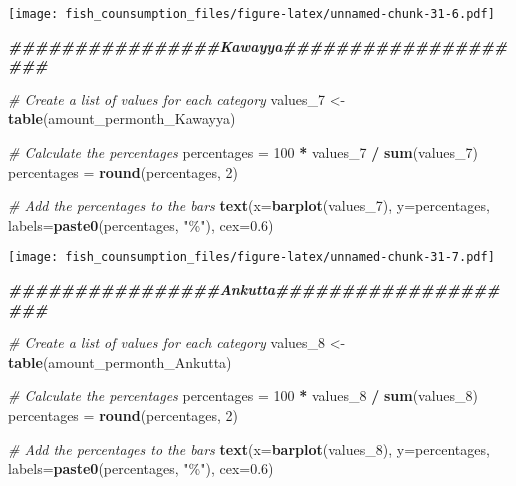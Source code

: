 \documentclass[
]{article}
\newenvironment{Shaded}{\begin{snugshade}}{\end{snugshade}}
\newcommand{\AttributeTok}[1]{\textcolor[rgb]{0.13,0.29,0.53}{#1}}
\newcommand{\CommentTok}[1]{\textcolor[rgb]{0.56,0.35,0.01}{\textit{#1}}}
\newcommand{\DecValTok}[1]{\textcolor[rgb]{0.00,0.00,0.81}{#1}}
\newcommand{\DocumentationTok}[1]{\textcolor[rgb]{0.56,0.35,0.01}{\textbf{\textit{#1}}}}
\newcommand{\FloatTok}[1]{\textcolor[rgb]{0.00,0.00,0.81}{#1}}
\newcommand{\FunctionTok}[1]{\textcolor[rgb]{0.13,0.29,0.53}{\textbf{#1}}}
\newcommand{\NormalTok}[1]{#1}
\newcommand{\OtherTok}[1]{\textcolor[rgb]{0.56,0.35,0.01}{#1}}
\newcommand{\SpecialCharTok}[1]{\textcolor[rgb]{0.81,0.36,0.00}{\textbf{#1}}}
\newcommand{\StringTok}[1]{\textcolor[rgb]{0.31,0.60,0.02}{#1}}
\begin{document}
\texttt{[image: fish\_counsumption\_files/figure-latex/unnamed-chunk-31-6.pdf]}

\begin{Shaded}
\begin{Highlighting}[]
\DocumentationTok{\#\#\#\#\#\#\#\#\#\#\#\#\#\#\#\#Kawayya\#\#\#\#\#\#\#\#\#\#\#\#\#\#\#\#\#\#\#\#}

\CommentTok{\# Create a list of values for each category}
\NormalTok{values\_7 }\OtherTok{\textless{}{-}} \FunctionTok{table}\NormalTok{(amount\_permonth\_Kawayya)}

\CommentTok{\# Calculate the percentages}
\NormalTok{percentages }\OtherTok{=} \DecValTok{100} \SpecialCharTok{*}\NormalTok{ values\_7 }\SpecialCharTok{/} \FunctionTok{sum}\NormalTok{(values\_7)}
\NormalTok{percentages }\OtherTok{=} \FunctionTok{round}\NormalTok{(percentages, }\DecValTok{2}\NormalTok{)}

\CommentTok{\# Add the percentages to the bars}
\FunctionTok{text}\NormalTok{(}\AttributeTok{x=}\FunctionTok{barplot}\NormalTok{(values\_7), }\AttributeTok{y=}\NormalTok{percentages, }\AttributeTok{labels=}\FunctionTok{paste0}\NormalTok{(percentages, }\StringTok{"\%"}\NormalTok{), }\AttributeTok{cex=}\FloatTok{0.6}\NormalTok{)}
\end{Highlighting}
\end{Shaded}

\texttt{[image: fish\_counsumption\_files/figure-latex/unnamed-chunk-31-7.pdf]}

\begin{Shaded}
\begin{Highlighting}[]
\DocumentationTok{\#\#\#\#\#\#\#\#\#\#\#\#\#\#\#\#Ankutta\#\#\#\#\#\#\#\#\#\#\#\#\#\#\#\#\#\#\#\#}

\CommentTok{\# Create a list of values for each category}
\NormalTok{values\_8 }\OtherTok{\textless{}{-}} \FunctionTok{table}\NormalTok{(amount\_permonth\_Ankutta)}

\CommentTok{\# Calculate the percentages}
\NormalTok{percentages }\OtherTok{=} \DecValTok{100} \SpecialCharTok{*}\NormalTok{ values\_8 }\SpecialCharTok{/} \FunctionTok{sum}\NormalTok{(values\_8)}
\NormalTok{percentages }\OtherTok{=} \FunctionTok{round}\NormalTok{(percentages, }\DecValTok{2}\NormalTok{)}

\CommentTok{\# Add the percentages to the bars}
\FunctionTok{text}\NormalTok{(}\AttributeTok{x=}\FunctionTok{barplot}\NormalTok{(values\_8), }\AttributeTok{y=}\NormalTok{percentages, }\AttributeTok{labels=}\FunctionTok{paste0}\NormalTok{(percentages, }\StringTok{"\%"}\NormalTok{), }\AttributeTok{cex=}\FloatTok{0.6}\NormalTok{)}
\end{Highlighting}
\end{Shaded}
\end{document}
